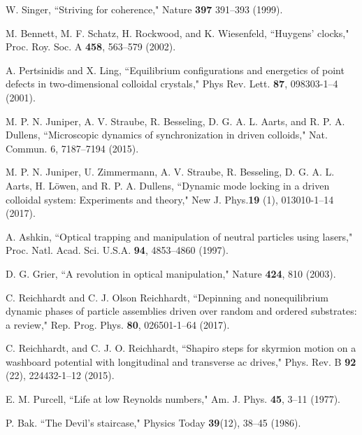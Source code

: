 \documentclass[preprint,showpacs,preprintnumbers,amsmath,amssymb,aps,prb]{revtex4-1}
\theoremstyle{remark}
\begin{document}
\begin{thebibliography}{99}
   W. Singer, ``Striving for coherence,"  Nature {\bf 397} 391--393 (1999).

   M. Bennett, M. F. Schatz, H. Rockwood, and K. Wiesenfeld, ``Huygens' clocks," Proc. Roy. Soc. A {\bf 458}, 563--579 (2002).

    
   A. Pertsinidis and X. Ling,  ``Equilibrium configurations and energetics of point defects in two-dimensional colloidal crystals," Phys Rev. Lett.  {\bf 87}, 098303-1--4 (2001). %

   M. P. N. Juniper, A. V. Straube, R. Besseling, D. G. A. L. Aarts, and R. P. A. Dullens, ``Microscopic dynamics of synchronization in driven colloids," Nat. Commun. 6, 7187--7194 (2015). 
      
   M. P. N. Juniper,  U. Zimmermann, A. V. Straube, R. Besseling, D. G. A. L. Aarts, H. L{\"o}wen, and R. P. A. Dullens,  ``Dynamic mode locking in a driven colloidal system: Experiments and theory," New J. Phys.{\bf 19} (1), 013010-1--14 (2017).  %

   A. Ashkin, ``Optical trapping and manipulation of neutral particles using lasers," Proc. Natl. Acad. Sci. U.S.A. {\bf 94}, 4853--4860 (1997).

   D. G. Grier, ``A revolution in optical manipulation," Nature {\bf 424}, 810 (2003).

   C. Reichhardt and C. J. Olson Reichhardt, ``Depinning and nonequilibrium dynamic phases of particle assemblies driven over random and ordered substrates: a review," Rep. Prog. Phys. {\bf 80}, 026501-1--64 (2017). %

   C. Reichhardt, and C. J. O. Reichhardt,  ``Shapiro steps for skyrmion motion on a washboard potential with longitudinal and transverse ac drives," Phys. Rev. B {\bf 92} (22), 224432-1--12 (2015).      

   E. M. Purcell, ``Life at low Reynolds numbers,"  Am. J. Phys. {\bf 45}, 3--11 (1977).
  
   P. Bak. ``The Devil's staircase," Physics Today {\bf 39}(12), 38--45 (1986).


\end{thebibliography}
\end{document}
